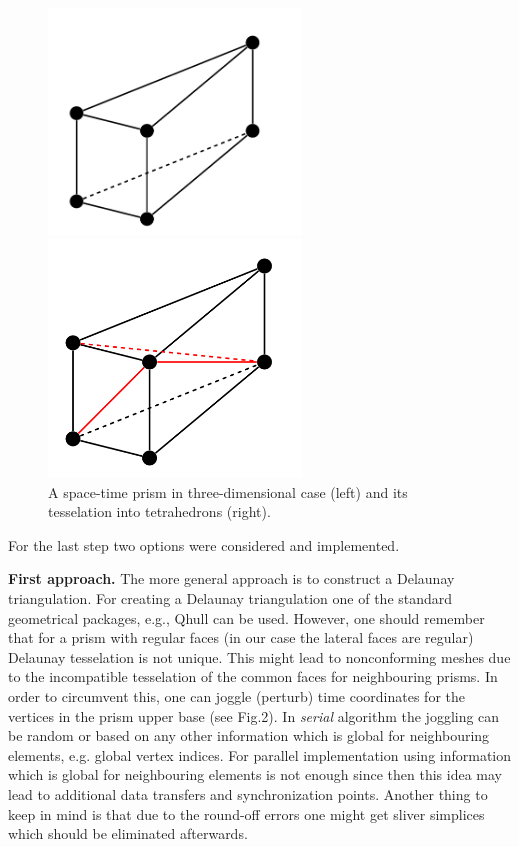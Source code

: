 \documentclass[12pt]{article}
\begin{document}
\begin{figure}
\begin{minipage}{0.5\textwidth}
\centering
\includegraphics[width = 0.6\textwidth]{prism.png}
\end{minipage}
\hfill
\begin{minipage}{0.5\textwidth}
\centering
\includegraphics[width = 0.6\textwidth]{triangulated_prism.png}
\end{minipage}
\caption{A space-time prism in three-dimensional case (left) and its tesselation into tetrahedrons (right).}
\end{figure}

For the last step two options were considered and implemented.

\textbf{First approach.} The more general approach \cite{Behr} is to construct a Delaunay triangulation. For creating a Delaunay triangulation one of the standard geometrical packages, e.g., Qhull \cite{qhull} can be used. 
However, one should remember that for a prism with regular faces (in our case the lateral faces are regular) Delaunay tesselation is not unique. This might lead to nonconforming meshes due to the incompatible tesselation of the common faces for neighbouring prisms.
In order to circumvent this, one can joggle (perturb) time coordinates for the vertices in the prism upper base (see Fig.2). In \textit{serial} algorithm the joggling can be random or based on any other information which is global for neighbouring elements, e.g. global vertex indices. For parallel implementation using information which is global for neighbouring elements is not enough since then this idea may lead to additional data transfers and synchronization points. 
Another thing to keep in mind is that due to the round-off errors one might get sliver simplices which should be eliminated afterwards.
\end{document}
